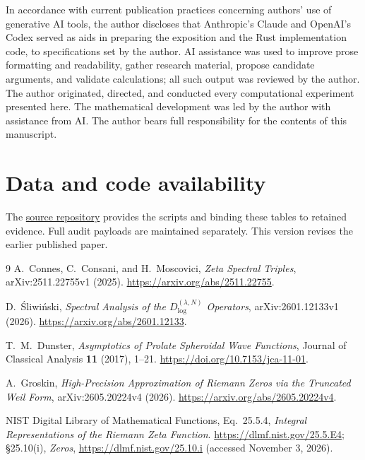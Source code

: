 \documentclass[11pt,a4paper]{article}
\begin{document}
In accordance with current publication practices concerning authors'
use of generative AI tools, the author discloses that Anthropic's
Claude and OpenAI's Codex served as aids in preparing the exposition
and the Rust implementation code, to specifications set by the author.
AI assistance was used to improve prose formatting and readability,
gather research material, propose candidate arguments, and validate
calculations; all such output was reviewed by the author. The author
originated, directed, and conducted every computational experiment
presented here. The mathematical development was led by the author
with assistance from AI. The author bears full responsibility for the
contents of this manuscript.

\section*{Data and code availability}

The \href{https://github.com/TeamXcelerator/ccm-convergence-rate-falsifications}{source repository}
provides the scripts and  binding
these tables to retained evidence. Full audit payloads are maintained
separately. This version revises the earlier published paper.

\begin{thebibliography}{9}
A.~Connes, C.~Consani, and H.~Moscovici,
\emph{Zeta Spectral Triples}, arXiv:2511.22755v1 (2025).
\url{https://arxiv.org/abs/2511.22755}.

D.~\'Sliwi\'nski,
\emph{Spectral Analysis of the $D_{\log}^{(\lambda,N)}$ Operators},
arXiv:2601.12133v1 (2026).
\url{https://arxiv.org/abs/2601.12133}.

T.~M.~Dunster,
\emph{Asymptotics of Prolate Spheroidal Wave Functions},
Journal of Classical Analysis \textbf{11} (2017), 1--21.
\url{https://doi.org/10.7153/jca-11-01}.

A.~Groskin,
\emph{High-Precision Approximation of Riemann Zeros via the Truncated Weil Form},
arXiv:2605.20224v4 (2026).
\url{https://arxiv.org/abs/2605.20224v4}.

NIST Digital Library of Mathematical Functions,
Eq.~25.5.4, \emph{Integral Representations of the Riemann Zeta Function}.
\url{https://dlmf.nist.gov/25.5.E4}; \S25.10(i), \emph{Zeros},
\url{https://dlmf.nist.gov/25.10.i} (accessed November 3, 2026).
\end{thebibliography}
\end{document}

